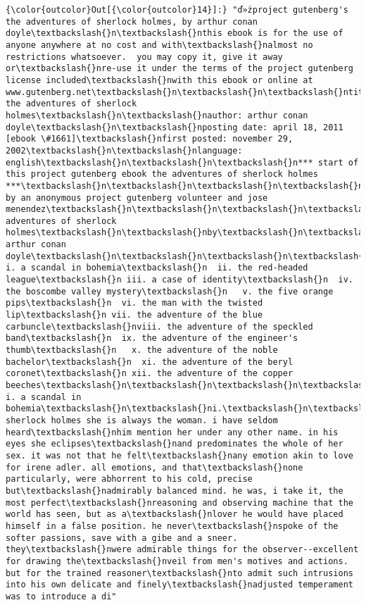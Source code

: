 \documentclass[11pt]{article}
\begin{document}
\begin{Verbatim}[commandchars=\\\{\}]
{\color{outcolor}Out[{\color{outcolor}14}]:} "ď»żproject gutenberg's the adventures of sherlock holmes, by arthur conan doyle\textbackslash{}n\textbackslash{}nthis ebook is for the use of anyone anywhere at no cost and with\textbackslash{}nalmost no restrictions whatsoever.  you may copy it, give it away or\textbackslash{}nre-use it under the terms of the project gutenberg license included\textbackslash{}nwith this ebook or online at www.gutenberg.net\textbackslash{}n\textbackslash{}n\textbackslash{}ntitle: the adventures of sherlock holmes\textbackslash{}n\textbackslash{}nauthor: arthur conan doyle\textbackslash{}n\textbackslash{}nposting date: april 18, 2011 [ebook \#1661]\textbackslash{}nfirst posted: november 29, 2002\textbackslash{}n\textbackslash{}nlanguage: english\textbackslash{}n\textbackslash{}n\textbackslash{}n*** start of this project gutenberg ebook the adventures of sherlock holmes ***\textbackslash{}n\textbackslash{}n\textbackslash{}n\textbackslash{}n\textbackslash{}nproduced by an anonymous project gutenberg volunteer and jose menendez\textbackslash{}n\textbackslash{}n\textbackslash{}n\textbackslash{}n\textbackslash{}n\textbackslash{}n\textbackslash{}n\textbackslash{}n\textbackslash{}n\textbackslash{}nthe adventures of sherlock holmes\textbackslash{}n\textbackslash{}nby\textbackslash{}n\textbackslash{}nsir arthur conan doyle\textbackslash{}n\textbackslash{}n\textbackslash{}n\textbackslash{}n   i. a scandal in bohemia\textbackslash{}n  ii. the red-headed league\textbackslash{}n iii. a case of identity\textbackslash{}n  iv. the boscombe valley mystery\textbackslash{}n   v. the five orange pips\textbackslash{}n  vi. the man with the twisted lip\textbackslash{}n vii. the adventure of the blue carbuncle\textbackslash{}nviii. the adventure of the speckled band\textbackslash{}n  ix. the adventure of the engineer's thumb\textbackslash{}n   x. the adventure of the noble bachelor\textbackslash{}n  xi. the adventure of the beryl coronet\textbackslash{}n xii. the adventure of the copper beeches\textbackslash{}n\textbackslash{}n\textbackslash{}n\textbackslash{}n\textbackslash{}nadventure i. a scandal in bohemia\textbackslash{}n\textbackslash{}ni.\textbackslash{}n\textbackslash{}nto sherlock holmes she is always the woman. i have seldom heard\textbackslash{}nhim mention her under any other name. in his eyes she eclipses\textbackslash{}nand predominates the whole of her sex. it was not that he felt\textbackslash{}nany emotion akin to love for irene adler. all emotions, and that\textbackslash{}none particularly, were abhorrent to his cold, precise but\textbackslash{}nadmirably balanced mind. he was, i take it, the most perfect\textbackslash{}nreasoning and observing machine that the world has seen, but as a\textbackslash{}nlover he would have placed himself in a false position. he never\textbackslash{}nspoke of the softer passions, save with a gibe and a sneer. they\textbackslash{}nwere admirable things for the observer--excellent for drawing the\textbackslash{}nveil from men's motives and actions. but for the trained reasoner\textbackslash{}nto admit such intrusions into his own delicate and finely\textbackslash{}nadjusted temperament was to introduce a di"
\end{Verbatim}
            
\end{document}
